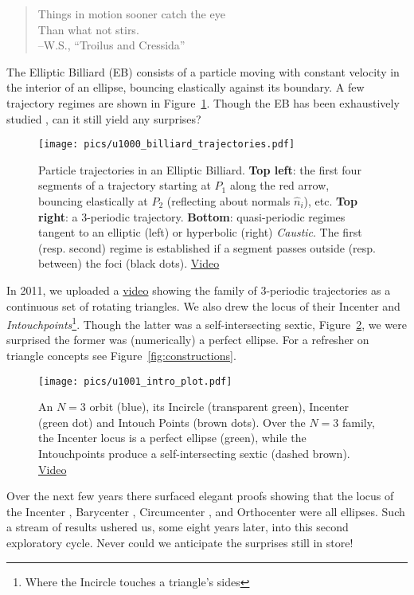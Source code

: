 \begin{quote}
Things in motion sooner catch the eye\\
Than what not stirs.\\
--W.S., ``Troilus and Cressida'' 
\end{quote}

The Elliptic Billiard (EB) consists of a particle moving with constant velocity in the interior of an ellipse, bouncing elastically against its boundary. A few trajectory regimes are shown in Figure~\ref{fig:billiard-trajectories}. Though the EB has been exhaustively studied \cite{dragovic11,sergei91}, can it still yield any surprises?

\begin{figure}
    \centering
    \texttt{[image: pics/u1000\_billiard\_trajectories.pdf]}
    \caption{Particle trajectories in an Elliptic Billiard. \textbf{Top left}: the first four segments of a trajectory starting at $P_1$ along the red arrow, bouncing elastically at $P_2$ (reflecting about normals $\hat{n}_i$), etc. \textbf{Top right}: a 3-periodic trajectory. \textbf{Bottom}: quasi-periodic regimes tangent to an elliptic (left) or hyperbolic (right) {\em Caustic}. The first (resp. second) regime is established if a segment passes outside (resp. between) the foci (black dots).
    \href{https://youtu.be/A7mPzrNJHkA}{Video} \cite[pl\#1]{dsr_math_intell_playlist}}
    \label{fig:billiard-trajectories}
\end{figure}

In 2011, we uploaded a
\href{https://www.youtube.com/watch?v=9xU6T7hQMzs}{video} \cite[pl\#2]{dsr_math_intell_playlist} showing the family of 3-periodic trajectories as a continuous set of rotating triangles. We also drew the locus of their Incenter and {\em Intouchpoints}\footnote{Where the Incircle touches a triangle's sides}. Though the latter was a self-intersecting sextic, Figure~\ref{fig:intro-plot}, we were surprised the former was (numerically) a perfect ellipse. For a refresher on triangle concepts see Figure~\ref{fig:constructions}. 

\begin{figure}
    \centering
    \texttt{[image: pics/u1001\_intro\_plot.pdf]}
    \caption{An $N=3$ orbit (blue), its Incircle (transparent green), Incenter (green dot) and Intouch Points (brown dots). Over the $N=3$ family, the Incenter locus is a perfect ellipse (green), while the Intouchpoints produce a self-intersecting sextic (dashed brown).
    \href{https://youtu.be/9xU6T7hQMzs}{Video} \cite[pl\#2]{dsr_math_intell_playlist}}
    \label{fig:intro-plot}
\end{figure}
%
 Over the next few years there surfaced elegant proofs showing that the locus of the Incenter \cite{ronaldo16,olga14}, Barycenter \cite{ronaldo19,sergei2016}, Circumcenter  \cite{corentin19,ronaldo19}, and Orthocenter \cite{ronaldo19} were all ellipses. Such a stream of results ushered us, some eight years later, into this second exploratory cycle. Never could we anticipate the surprises still in store!

